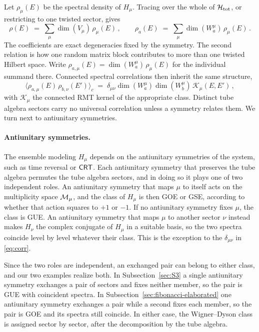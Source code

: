 \documentclass[11pt]{article}
\numberwithin{equation}{section}
\begin{document}
Let $\rho_\mu(E)$ be the spectral density of $H_\mu$. Tracing over the whole of $\mathcal{H}_{\rm tot}$, or
restricting to one twisted sector, gives
\begin{equation}
  \rho(E) \;=\; \sum_\mu \dim(V_\mu)\, \rho_\mu(E) \,,
  \qquad
  \rho_a(E) \;=\; \sum_\mu \dim(W^\mu_a)\, \rho_\mu(E) \,.
  \label{eq:densities}
\end{equation}
The coefficients are exact degeneracies fixed by the symmetry. The second relation is how one
random matrix block contributes to more than one twisted Hilbert space. Write
$\rho_{a,\mu}(E) = \dim(W^\mu_a)\,\rho_\mu(E)$ for the individual summand there.
Connected spectral correlations then inherit the same structure,
\begin{equation}
  \big\langle \rho_{a,\mu}(E)\, \rho_{b,\nu}(E') \big\rangle_c
  \;=\; \delta_{\mu\nu} \dim(W^\mu_a) \dim(W^\mu_b)\, \mathcal K_\mu(E,E') \,,
  \label{eq:corr}
\end{equation}
with $\mathcal K_\mu$ the connected RMT kernel of the appropriate class. Distinct tube algebra sectors carry
no universal correlation unless a symmetry relates them. We turn next to antiunitary symmetries.

\paragraph{Antiunitary symmetries.}
The ensemble modeling $H_\mu$ depends on the antiunitary symmetries of the system, such as time
reversal or $\mathsf{CRT}$. Each antiunitary symmetry that preserves the tube algebra permutes the tube
algebra sectors, and in doing so it plays one of two independent roles. An antiunitary symmetry
that maps $\mu$ to itself acts on the multiplicity space $\mathcal{M}_\mu$, and the class of $H_\mu$ is
then GOE or GSE, according to whether that action squares to $+1$ or $-1$. If no antiunitary
symmetry fixes $\mu$, the class is GUE. An antiunitary symmetry that maps $\mu$ to another sector $\nu$ instead makes
$H_\nu$ the complex conjugate of $H_\mu$ in a suitable basis, so the two spectra coincide level by
level whatever their class. This is the exception to the $\delta_{\mu\nu}$ in \eqref{eq:corr}.

Since the two roles are independent, an exchanged pair can belong to either class, and our two
examples realize both. In Subsection~\ref{sec:S3} a single antiunitary symmetry exchanges a
pair of sectors and fixes neither member, so the pair is GUE with coincident spectra. In
Subsection~\ref{sec:fibonacci-elaborated} one antiunitary symmetry exchanges a pair while a second fixes each member, so
the pair is GOE and its spectra still coincide. In either case, the Wigner--Dyson class is assigned sector by
sector, after the decomposition by the tube algebra.
\end{document}
